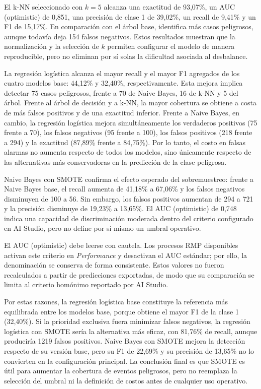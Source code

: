 \documentclass[12pt,a4paper]{article}
\begin{document}
El k-NN seleccionado con $k=5$ alcanza una exactitud de 93,07\%, un AUC (optimistic) de 0,851, una precisión de clase 1 de 39,02\%, un recall de 9,41\% y un F1 de 15,17\%. En comparación con el árbol base, identifica más casos peligrosos, aunque todavía deja 154 falsos negativos. Estos resultados muestran que la normalización y la selección de $k$ permiten configurar el modelo de manera reproducible, pero no eliminan por sí solas la dificultad asociada al desbalance.

La regresión logística alcanza el mayor recall y el mayor F1 agregados de los cuatro modelos base: 44,12\% y 32,40\%, respectivamente. Esta mejora implica detectar 75 casos peligrosos, frente a 70 de Naive Bayes, 16 de k-NN y 5 del árbol. Frente al árbol de decisión y a k-NN, la mayor cobertura se obtiene a costa de más falsos positivos y de una exactitud inferior. Frente a Naive Bayes, en cambio, la regresión logística mejora simultáneamente los verdaderos positivos (75 frente a 70), los falsos negativos (95 frente a 100), los falsos positivos (218 frente a 294) y la exactitud (87,89\% frente a 84,75\%). Por lo tanto, el costo en falsas alarmas no aumenta respecto de todos los modelos, sino únicamente respecto de las alternativas más conservadoras en la predicción de la clase peligrosa.

Naive Bayes con SMOTE confirma el efecto esperado del sobremuestreo: frente a Naive Bayes base, el recall aumenta de 41,18\% a 67,06\% y los falsos negativos disminuyen de 100 a 56. Sin embargo, los falsos positivos aumentan de 294 a 721 y la precisión disminuye de 19,23\% a 13,65\%. El AUC (optimistic) de 0,748 indica una capacidad de discriminación moderada dentro del criterio configurado en AI Studio, pero no define por sí mismo un umbral operativo.

El AUC (optimistic) debe leerse con cautela. Los procesos RMP disponibles activan este criterio en \textit{Performance} y desactivan el AUC estándar; por ello, la denominación se conserva de forma consistente. Estos valores no fueron recalculados a partir de predicciones exportadas, de modo que su comparación se limita al criterio homónimo reportado por AI Studio.

Por estas razones, la regresión logística base constituye la referencia más equilibrada entre los modelos base, porque obtiene el mayor F1 de la clase 1 (32,40\%). Si la prioridad exclusiva fuera minimizar falsos negativos, la regresión logística con SMOTE sería la alternativa más eficaz, con 81,76\% de recall, aunque produciría 1219 falsos positivos. Naive Bayes con SMOTE mejora la detección respecto de su versión base, pero su F1 de 22,69\% y su precisión de 13,65\% no lo convierten en la configuración principal. La conclusión final es que SMOTE es útil para aumentar la cobertura de eventos peligrosos, pero no reemplaza la selección del umbral ni la definición de costos antes de cualquier uso operativo.
\end{document}
